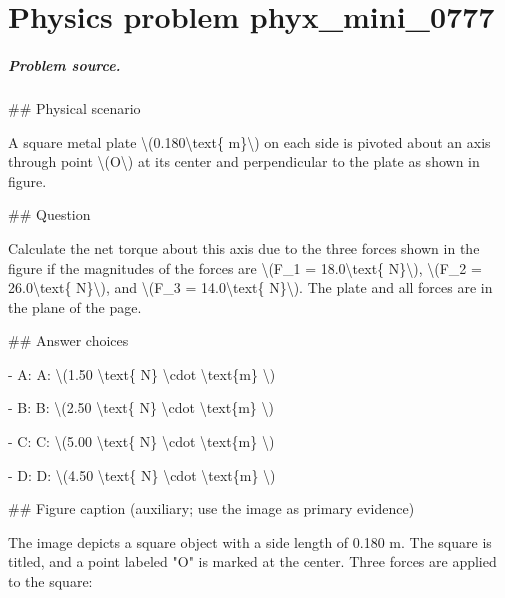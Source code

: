 
\chapter{Physics problem phyx\_mini\_0777}
\label{ch:PhyXMiniProblems_problem_phyx_mini_0777}

\paragraph{Problem source.}
\#\# Physical scenario

A square metal plate \textbackslash{}(0.180\textbackslash{}text\{ m\}\textbackslash{}) on each side is pivoted about an axis through point \textbackslash{}(O\textbackslash{}) at its center and perpendicular to the plate as shown in figure.

\#\# Question

Calculate the net torque about this axis due to the three forces shown in the figure if the magnitudes of the forces are \textbackslash{}(F\_1 = 18.0\textbackslash{}text\{ N\}\textbackslash{}), \textbackslash{}(F\_2 = 26.0\textbackslash{}text\{ N\}\textbackslash{}), and \textbackslash{}(F\_3 = 14.0\textbackslash{}text\{ N\}\textbackslash{}). The plate and all forces are in the plane of the page.

\#\# Answer choices

- A: A: \textbackslash{}(1.50 \textbackslash{}text\{ N\} \textbackslash{}cdot \textbackslash{}text\{m\} \textbackslash{})

- B: B: \textbackslash{}(2.50 \textbackslash{}text\{ N\} \textbackslash{}cdot \textbackslash{}text\{m\} \textbackslash{})

- C: C: \textbackslash{}(5.00 \textbackslash{}text\{ N\} \textbackslash{}cdot \textbackslash{}text\{m\} \textbackslash{})

- D: D: \textbackslash{}(4.50 \textbackslash{}text\{ N\} \textbackslash{}cdot \textbackslash{}text\{m\} \textbackslash{})

\#\# Figure caption (auxiliary; use the image as primary evidence)

The image depicts a square object with a side length of 0.180 m. The square is titled, and a point labeled "O" is marked at the center. Three forces are applied to the square:

